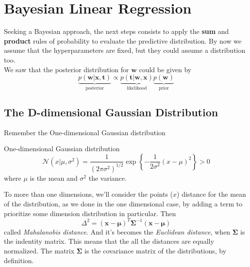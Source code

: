 \section{Bayesian Linear Regression}
\framecard{\insertsection}

\begin{frame}{\insertsection}
	Seeking a Bayesian approach, the next steps consists to apply the \textbf{sum} and \textbf{product} rules of probability to evaluate the predictive distribution. By now we assume that the hyperparameters are fixed, but they could assume a distribution too. \\
	\vspace{1em}
	We saw that the posterior distribution for $\mathbf{w}$ could be given by
	\begin{equation*}
		\underbrace{p\left( \mathbf{w} | \mathbf{x}, \mathbf{t} \right)}_{\text{posterior}} \propto \underbrace{p\left(  \mathbf{t} |\mathbf{w} ,\mathbf{x} \right)}_{\text{likelihood}}  \underbrace{p\left( \mathbf{w} \right)}_{\text{prior}}
	\end{equation*}

\end{frame}


\subsection{The D-dimensional Gaussian Distribution}

\begin{frame}{\insertsubsection}

Remember the One-dimensional Gaussian distribution
\begin{block}{One-dimensional Gaussian distribution}
\begin{equation*}
	\mathcal{N}(x | \mu, \sigma^2) = \frac{1}{(2 \pi \sigma^2)^{1/2}} \exp \left\{ -\frac{1}{2 \sigma^2} (x- \mu)^2 \right\} > 0
\end{equation*}
where $\mu$ is the mean and $\sigma^2$ the variance.
\end{block}
\end{frame}

\begin{frame}{\insertsubsection}
	To more than one dimensions, we'll consider the points ($x$) distance for the mean of the distribution, as we done in the one dimensional case, by adding a term to prioritize some dimension distribution in particular. Then
	\begin{equation*}
		\Delta^2 = (\mathbf{x} - \boldsymbol{\mu})^T \boldsymbol{\Sigma} ^{-1} (\mathbf{x} - \boldsymbol{\mu}) 
	\end{equation*}
called \textit{Mahalanobis distance}. And it's becomes the \textit{Euclidean distance}, when $\boldsymbol{\Sigma}$ is the indentity matrix. This means that the all the distances are equally normalized. The matrix $\boldsymbol{\Sigma}$ is the covariance matrix of the distributions, by definition.
\end{frame}

